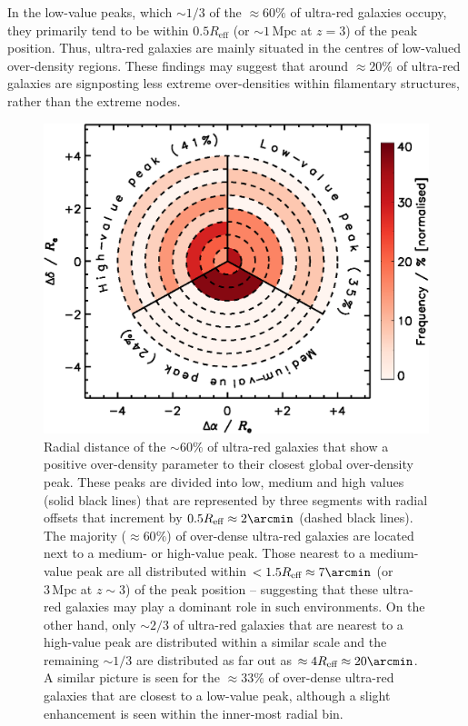 \documentclass[a4paper, fleqn, usenatbib]{mnras}
\newcommand{\megaparsec}{\text{Mpc}}
\newcommand{\reff}{R_{\text{eff}}}
\newcommand{\urgs}{ultra-red galaxies}
\begin{document}
In the low-value peaks, which $\sim1/3$ of the $\approx60\%$ of \urgs{} occupy, they primarily tend to be within $0.5\reff{}$ (or $\sim1\,\megaparsec{}$ at $z=3$) of the peak position.
Thus, \urgs{} are mainly situated in the centres of low-valued over-density regions.
These findings may suggest that around $\approx20\%$ of \urgs{} are signposting less extreme over-densities within filamentary structures, rather than the extreme nodes.

\begin{figure}
    \includegraphics[width=1.2\columnwidth]{proximity}
    \caption{Radial distance of the $\sim60\%$ of ultra-red galaxies that show a positive over-density parameter to their closest global over-density peak.
    These peaks are divided into low, medium and high values (solid black lines) that are represented by three segments with radial offsets that increment by $0.5R_{\text{eff}}\approx2\arcmin$ (dashed black lines).
    The majority ($\approx60\%$) of over-dense ultra-red galaxies are located next to a medium- or high-value peak.
    Those nearest to a medium-value peak are all distributed within $<1.5R_{\text{eff}}\approx7\arcmin$ (or $3\,\text{Mpc}$ at $z\sim3$) of the peak position -- suggesting that these ultra-red galaxies may play a dominant role in such environments.
    On the other hand, only $\sim2/3$ of ultra-red galaxies that are nearest to a high-value peak are distributed within a similar scale and the remaining $\sim1/3$ are distributed as far out as $\approx4R_{\text{eff}}\approx20\arcmin$.
    A similar picture is seen for the $\approx33\%$ of over-dense ultra-red galaxies that are closest to a low-value peak, although a slight enhancement is seen within the inner-most radial bin.}
    \label{fig:proximity}
\end{figure}
\end{document}
